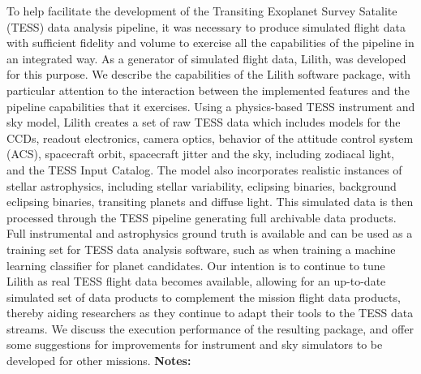 \documentclass{report}
\begin{document}
{{{{{{{{{{{{{{{{{{{{{{{{{{{{{{{{{{{{{{{{{{{{{{{{{{{{{{{{{{{{{{{{{{{{{{{{{{{{{{{{{{{{{{{{{{{{{{{{{{{{{{{{{{{{{{{{{{{{{{{{{{{{{{{{{{{{{{{{{{{{{{{{{{{{{{{{{{{{{{{{{{{{{{{{{{{{{{{{To help facilitate the development of the Transiting Exoplanet Survey Satalite (TESS) data analysis pipeline, it was necessary to produce simulated flight data with sufficient fidelity and volume to exercise all the capabilities of the pipeline in an integrated way. As a generator of simulated flight data, Lilith, was developed for this purpose. We describe the capabilities of the Lilith software package, with particular attention to the interaction between the implemented features and the pipeline capabilities that it exercises.  Using a physics-based TESS instrument and sky model, Lilith creates a set of raw TESS data which includes models for the CCDs, readout electronics, camera optics, behavior of the attitude control system (ACS), spacecraft orbit, spacecraft jitter and the sky, including zodiacal light, and the TESS Input Catalog. The model also incorporates realistic instances of stellar astrophysics, including stellar variability, eclipsing binaries, background eclipsing binaries, transiting planets and diffuse light. This simulated data is then processed through the TESS pipeline generating full archivable data products. Full instrumental and astrophysics ground truth is available and can be used as a training set for TESS data analysis software, such as when training a machine learning classifier for planet candidates. Our intention is to continue to tune Lilith as real TESS flight data becomes available, allowing for an up-to-date simulated set of data products to complement the mission flight data products, thereby aiding researchers as they continue to adapt their tools to the TESS data streams. We discuss the execution performance of the resulting package, and offer some suggestions for improvements for instrument and sky simulators to be developed for other missions.\newline
{\bf Notes:}\newline
{\newpage
}}}}}}}}}}}}}}}}}}}}}}}}}}}}}}}}}}}}}}}}}}}}}}}}}}}}}}}}}}}}}}}}}}}}}}}}}}}}}}}}}}}}}}}}}}}}}}}}}}}}}}}}}}}}}}}}}}}}}}}}}}}}}}}}}}}}}}}}}}}}}}}}}}}}}}}}}}}}}}}}}}}}}}}}}}}}}}}}}
\end{document}

